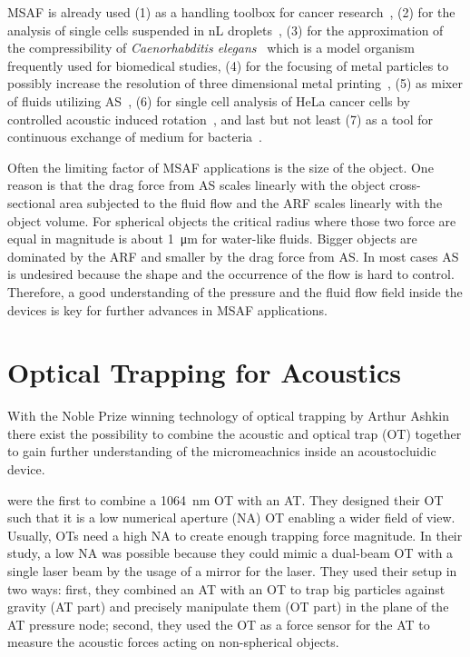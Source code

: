 MSAF is already used (1) as a handling toolbox for cancer 
research~\cite{Antfolk2015,Wu2021,Wang2020,Nguyen2021}, (2) for the analysis of 
single cells suspended in \si{\nano\liter} droplets~\cite{Gerlt2020a}, (3) for 
the approximation of the compressibility of \emph{Caenorhabditis 
elegans}~\cite{Baasch2018} which is a model organism frequently used for 
biomedical studies, (4) for the focusing of metal particles to possibly 
increase the resolution of three dimensional metal printing~\cite{Gerlt2022}, 
(5) as mixer of fluids utilizing 
AS~\cite{Patel2014,Ozcelik2014,Bachman2020,Zhang2021}, (6) for single cell 
analysis of HeLa cancer cells by controlled acoustic induced 
rotation~\cite{Laeubli2021}, and last but not least (7) as a tool for 
continuous exchange of medium for bacteria~\cite{Gerlt2021}.

Often the limiting factor of MSAF applications is the size of the object. One 
reason is that the drag force from AS scales linearly with the object 
cross-sectional area subjected to the fluid flow and the ARF scales linearly 
with the object volume. For spherical objects the critical radius where those 
two force are equal in magnitude is about \SI{1}{\um} for water-like fluids. 
Bigger objects are dominated by the ARF and smaller by the drag force from AS. 
In most cases AS is undesired because the shape and the occurrence of the flow 
is hard to control. Therefore, a good understanding of the pressure and the 
fluid flow field inside the devices is key for further advances in MSAF 
applications.

\section{Optical Trapping for Acoustics}

With the Noble Prize winning technology of optical trapping by Arthur 
Ashkin~\cite{Ashkin1978,Ashkin1987,Ashkin2002,Ashkin1986,Ashkin1992,Ashkin1997} 
there exist the possibility to combine the acoustic and optical trap (OT) 
together to gain further understanding of the micromeachnics inside an 
acoustocluidic device.

 were the first to combine a \SI{1064}{\nm} OT with an 
AT. They designed their OT such that it is a low numerical aperture (NA) OT 
enabling a wider field of view. Usually, OTs need a high NA to create enough 
trapping force magnitude. In their study, a low NA was possible because they 
could mimic a dual-beam OT with a single laser beam by the usage of a mirror 
for the laser. They used their setup in two ways: first, they combined an AT 
with an OT to trap big particles against gravity (AT part) and precisely 
manipulate them (OT part) in the plane of the AT pressure node; second, they 
used the OT as a force sensor for the AT to measure the acoustic forces acting 
on non-spherical objects.

